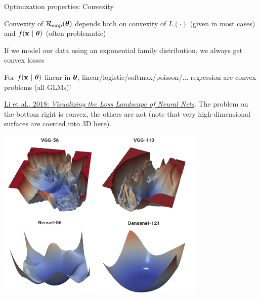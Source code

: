 \documentclass[11pt,compress,t,notes=noshow, xcolor=table]{beamer}
\begin{document}
\begin{vbframe}{Optimization properties: Convexity}

\begin{itemizeL}
\item Convexity of $\mathcal{R}_{\text{emp}}(\bm{\theta})$ depends both on convexity of $L(\cdot)$ (given in most cases) and $f(\mathbf{x} ~|~ \bm{\theta})$ (often problematic)
\item If we model our data using an exponential family distribution, we always get convex losses 
\item For $f(\mathbf{x} ~|~ \bm{\theta})$ linear in $\bm{\theta}$, linear/logistic/softmax/poisson/$\ldots$ regression are convex problems (all GLMs)! 
\end{itemizeL} 

\vfill

\begin{minipage}[b]{0.5\textwidth}
  \footnotesize \raggedright
  \href{https://arxiv.org/pdf/1712.09913.pdf}{Li et al., 2018: 
  \textit{Visualizing the Loss Landscape of Neural Nets}}. 
  The problem on the bottom right is convex, the others are not (note that 
  very high-dimensional surfaces are coerced into 3D here).  
  \\
  \phantom{foo}
\end{minipage}%
\begin{minipage}[b]{0.05\textwidth}
  \phantom{foo}
\end{minipage}%
\begin{minipage}[b]{0.45\textwidth}
  \includegraphics[width=0.75\textwidth]{
  figure_man/convex-vs-nonconfex-landscape}
\end{minipage}%

\end{vbframe}

\end{document}
